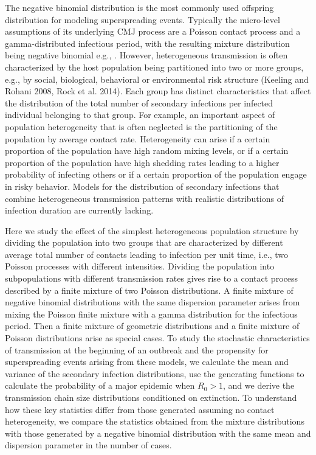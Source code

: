 \documentclass{imammb}
\numberwithin{equation}{section}
\begin{document}
The negative binomial distribution is the most commonly used offspring distribution for modeling superspreading events. Typically the micro-level assumptions of its underlying CMJ process are a Poisson contact process and a gamma-distributed infectious period, with the resulting mixture distribution being negative binomial e.g., \citep{Lloyd-Smith2005-ma}. However, heterogeneous transmission is often characterized by the host population being partitioned into two or more groups, e.g., by social, biological, behavioral or environmental risk structure (Keeling and Rohani 2008, Rock et al. 2014).   Each group has distinct characteristics that affect the distribution of the total number of secondary infections per infected individual belonging to that group. For example, an important aspect of population heterogeneity that is often neglected is the partitioning of the population by average contact rate. Heterogeneity can arise if a certain proportion of the population have high random mixing levels, or if a certain proportion of the population have high shedding rates leading to a higher probability of infecting others or if a certain proportion of the population engage in risky behavior. Models for the distribution of secondary infections that combine heterogeneous transmission patterns with realistic distributions of infection duration are currently lacking.
 
Here we study the effect of the simplest heterogeneous population structure by dividing the population into two groups that are characterized by different average total number of contacts leading to infection per unit time, i.e., two Poisson processes with different intensities. Dividing the population into subpopulations with different transmission rates gives rise to a contact process described by a finite mixture of two Poisson distributions. A finite mixture of negative binomial distributions with the same dispersion parameter arises from mixing the Poisson finite mixture with a gamma distribution for the infectious period. Then a finite mixture of geometric distributions and a finite mixture of Poisson distributions arise as special cases.  To study the stochastic characteristics of transmission at the beginning of an outbreak and the propensity for superspreading events arising from these models, we calculate the mean and variance of the secondary infection distributions, use the generating functions to calculate the probability of a major epidemic when $R_0>1$, and we derive the transmission chain size distributions conditioned on extinction. To understand how these key statistics differ from those generated assuming no contact heterogeneity, we compare the statistics obtained from the mixture distributions with those generated by a negative binomial distribution with the same mean and dispersion parameter in the number of cases.  %
\end{document}

